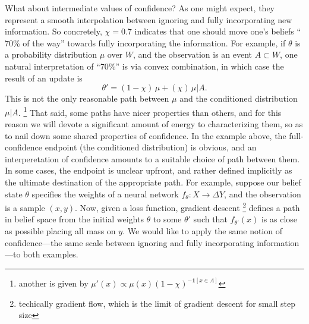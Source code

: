 \documentclass{article}
\begin{document}
What about intermediate values of confidence?  
As one might expect, they represent a smooth interpolation between ignoring and fully incorporating new information. 
So concretely, $\chi = 0.7$ indicates that one should move one's beliefs ``$70\%$ of the way'' towards fully incorporating the information.
For example, if $\theta$ is a probability distribution $\mu$ over $W$, and the observation is an event $A \subset W$, one natural interpretation of ``70\%'' is via convex combination, in which case the result of an update is
\[
 	\theta' = (1-\chi)\, \mu + (\chi)\, \mu|A. 
\]
This is not the only reasonable path between $\mu$ and the conditioned distribution $\mu|A$.%
	\footnote{
	another is given by $\mu'(x) \propto \mu(x) (1-\chi)^{-\mathbf1[x \in A]}$}
That said, some paths have nicer properties than others, and for this reason we will devote a significant amount of energy to characterizing them, so as to nail down some shared properties of confidence.
In the example above,
the full-confidence endpoint (the conditioned distribution) is obvious, and an interperetation of confidence amounts to a suitable choice of path between them. 
In some cases, the endpoint is unclear upfront, and rather defined implicitly as the ultimate destination of the appropriate path. 
For example, suppose our belief state $\theta$ specifies the weights of a neural network $f_\theta : X \to \Delta Y$, and the observation is a sample $(x,y)$. 
Now, given a loss function, gradient descent%
	\footnote{techically gradient flow, which is the limit of gradient descent for small step size}
 defines a path in belief space from the initial weights $\theta$ to some $\theta'$ such that $f_{\theta'}(x)$ is as close as possible placing all mass on $y$. 
We would like to apply the same notion of confidence---the same scale between ignoring and fully incorporating information---to both examples. 

\end{document}
